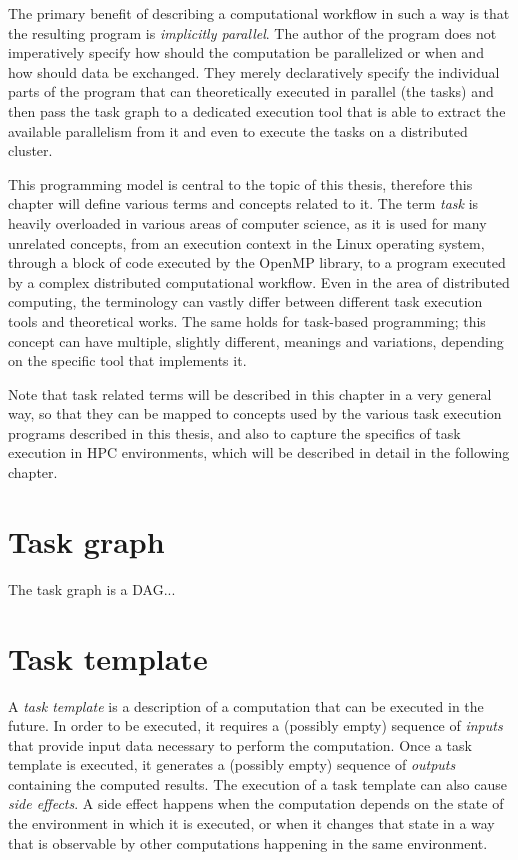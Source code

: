 The primary benefit of describing a computational workflow in such a way is that the resulting
program is \emph{implicitly parallel}. The author of the program does not imperatively specify how
should the computation be parallelized or when and how should data be exchanged. They merely
declaratively specify the individual parts of the program that can theoretically executed in
parallel (the tasks) and then pass the task graph to a dedicated execution tool that is able to
extract the available parallelism from it and even to execute the tasks on a distributed cluster.

This programming model is central to the topic of this thesis, therefore this chapter will define
various terms and concepts related to it. The term \emph{task} is heavily overloaded in
various areas of computer science, as it is used for many unrelated concepts, from an execution
context in the Linux operating system, through a block of code executed by the OpenMP library, to a
program executed by a complex distributed computational workflow. Even in the area of distributed
computing, the terminology can vastly differ between different task execution tools and theoretical
works. The same holds for task-based programming; this concept can have multiple, slightly
different, meanings and variations, depending on the specific tool that implements it.

Note that task related terms will be described in this chapter in a very general way, so that they
can be mapped to concepts used by the various task execution programs described in this thesis, and
also to capture the specifics of task execution in HPC environments, which will be described in
detail in the following chapter. %

\section{Task graph}
The task graph is a DAG...

\section{Task template}
A \emph{task template} is a description of a computation that can be executed in the future. In
order to be executed, it requires a (possibly empty) sequence of \emph{inputs} that
provide input data necessary to perform the computation. Once a task template is executed, it
generates a (possibly empty) sequence of \emph{outputs} containing the computed results.
The execution of a task template can also cause \emph{side effects}. A side effect happens when
the computation depends on the state of the environment in which it is executed, or when it changes
that state in a way that is observable by other computations happening in the same environment.

